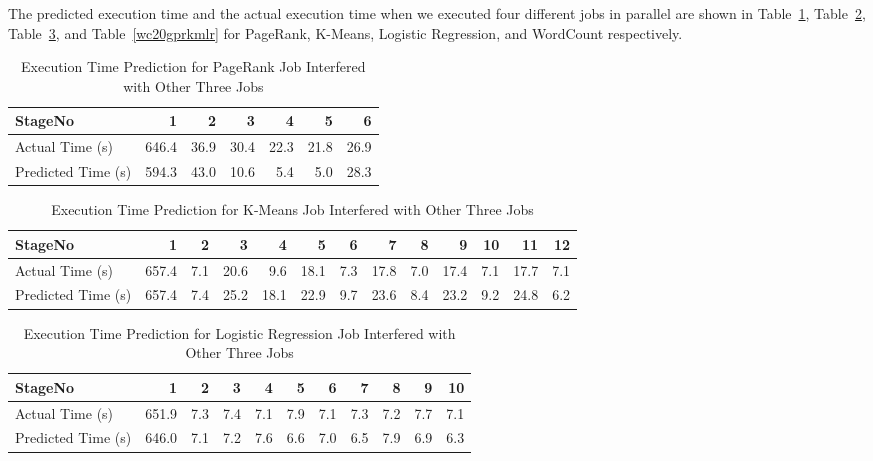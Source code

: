 \noindent
The predicted execution time and the actual execution time when we executed four different jobs in parallel are shown in Table~\ref{pr20gkmlrwc}, Table~\ref{km20gprlrwc}, Table~\ref{lr20gprkmwc}, and Table~\ref{wc20gprkmlr} for PageRank, K-Means, Logistic Regression, and WordCount respectively. 



\begin{table}[!htb]
\renewcommand{\arraystretch}{1.3}
\caption{Execution Time Prediction for PageRank Job Interfered with Other Three Jobs}
\label{pr20gkmlrwc}
\centering
\begin{tabular}{l|r|r|r|r|r|r}
\hline
\bfseries StageNo & \bfseries 1 & \bfseries 2 & \bfseries 3 & \bfseries 4 & \bfseries 5 & \bfseries 6 \\
\hline \hline
Actual Time (s)
&646.4
&36.9
&30.4
&22.3
&21.8
&26.9 \\
\hline
Predicted Time (s) 
&594.3
&43.0
&10.6
&5.4
&5.0
&28.3 \\
\hline
\end{tabular}
\end{table}

\begin{table}[!htb]
\renewcommand{\arraystretch}{1.3}
\caption{Execution Time Prediction for K-Means Job Interfered with Other Three Jobs}
\label{km20gprlrwc}
\centering
\begin{tabular}{l|r|r|r|r|r|r|r|r|r|r|r|r}
\hline
\bfseries StageNo & \bfseries 1 & \bfseries 2 & \bfseries 3 & \bfseries 4 & \bfseries 5 & \bfseries 6 & \bfseries 7 & \bfseries 8 & \bfseries 9 & \bfseries 10 & \bfseries 11 & \bfseries 12\\
\hline \hline
Actual Time (s)
&657.4
&7.1
&20.6
&9.6
&18.1
&7.3
&17.8
&7.0
&17.4
&7.1
&17.7
&7.1 \\
\hline
Predicted Time (s) 
&657.4
&7.4
&25.2
&18.1
&22.9
&9.7
&23.6
&8.4
&23.2
&9.2
&24.8
&6.2 \\
\hline
\end{tabular}
\end{table}

\begin{table}[!htb]
\renewcommand{\arraystretch}{1.3}
\caption{Execution Time Prediction for Logistic Regression Job Interfered with Other Three Jobs}
\label{lr20gprkmwc}
\centering
\begin{tabular}{l|r|r|r|r|r|r|r|r|r|r}
\hline
\bfseries StageNo & \bfseries 1 & \bfseries 2 & \bfseries 3 & \bfseries 4 & \bfseries 5 & \bfseries 6 & \bfseries 7 & \bfseries 8 & \bfseries 9 & \bfseries 10 \\
\hline \hline
Actual Time (s)
&651.9
&7.3
&7.4
&7.1
&7.9
&7.1
&7.3
&7.2
&7.7
&7.1\\
\hline
Predicted Time (s) 
&646.0
&7.1
&7.2
&7.6
&6.6
&7.0
&6.5
&7.9
&6.9
&6.3\\
\hline
\end{tabular}
\end{table}


